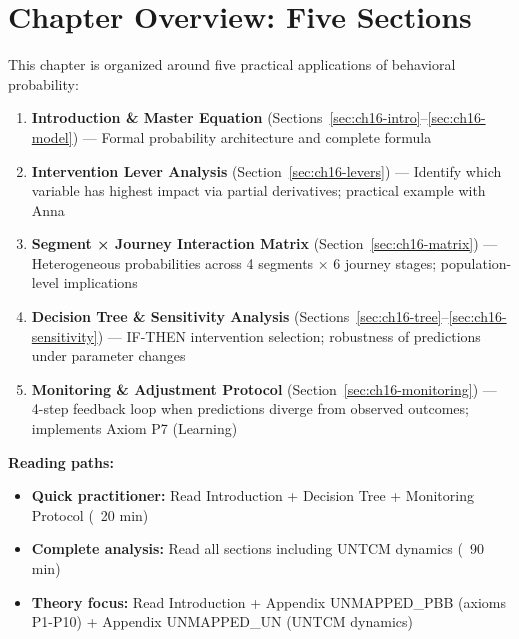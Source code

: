 
\section*{Chapter Overview: Five Sections}

This chapter is organized around five practical applications of behavioral probability:

\begin{enumerate}[label=\textbf{\arabic*.}]

\item \textbf{Introduction \& Master Equation} (Sections~\ref{sec:ch16-intro}--\ref{sec:ch16-model})
   — Formal probability architecture and complete formula

\item \textbf{Intervention Lever Analysis} (Section~\ref{sec:ch16-levers})
   — Identify which variable has highest impact via partial derivatives; practical example with Anna

\item \textbf{Segment × Journey Interaction Matrix} (Section~\ref{sec:ch16-matrix})
   — Heterogeneous probabilities across 4 segments × 6 journey stages; population-level implications

\item \textbf{Decision Tree \& Sensitivity Analysis} (Sections~\ref{sec:ch16-tree}--\ref{sec:ch16-sensitivity})
   — IF-THEN intervention selection; robustness of predictions under parameter changes

\item \textbf{Monitoring \& Adjustment Protocol} (Section~\ref{sec:ch16-monitoring})
   — 4-step feedback loop when predictions diverge from observed outcomes; implements Axiom P7 (Learning)

\end{enumerate}

\textbf{Reading paths:}
\begin{itemize}[nosep]
   \item \textbf{Quick practitioner:} Read Introduction + Decision Tree + Monitoring Protocol (~20 min)
   \item \textbf{Complete analysis:} Read all sections including UNTCM dynamics (~90 min)
   \item \textbf{Theory focus:} Read Introduction + Appendix UNMAPPED_PBB (axioms P1-P10) + Appendix UNMAPPED_UN (UNTCM dynamics)
\end{itemize}

